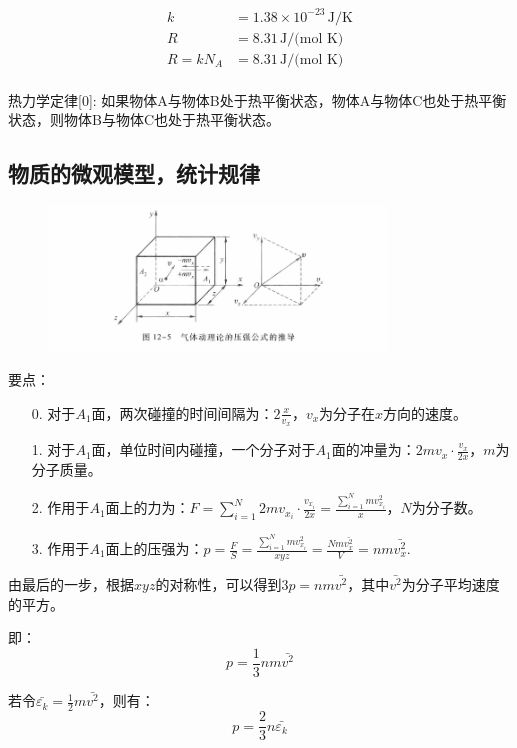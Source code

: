 \documentclass[10pt]{ctexart}
\begin{document}
\begin{align*}
    k &= 1.38 \times 10^{-23} \, \text{J/K} \\
    R &= 8.31 \, \text{J/(mol K)} \\
    R = k N_A &= 8.31 \, \text{J/(mol K)} \\
\end{align*}

热力学定律[0]: 如果物体A与物体B处于热平衡状态，物体A与物体C也处于热平衡状态，则物体B与物体C也处于热平衡状态。

\subsection{物质的微观模型，统计规律}
\label{subsec:物质的微观模型，统计规律}

\begin{figure}[H]
    \centering
    \includegraphics[width=0.8\textwidth]{img/12/1.png}
\end{figure}

要点：
\begin{itemize}
    \item [0.] 对于$A_1$面，两次碰撞的时间间隔为：$2 \frac{x}{v_x}$，$v_x$为分子在$x$方向的速度。
    \item [1.] 对于$A_1$面，单位时间内碰撞，一个分子对于$A_1$面的冲量为：$2 m v_x \cdot \frac{v_x}{2 x}$，$m$为分子质量。
    \item [2.] 作用于$A_1$面上的力为：$F = \sum_{i=1}^{N} 2 m v_{x_i} \cdot \frac{v_{x_i}}{2 x} = \frac{\sum_{i=1}^{N} m v_{x_i}^2 }{x}$，$N$为分子数。
    \item [3.] 作用于$A_1$面上的压强为：$p = \frac{F}{S} = \frac{\sum_{i=1}^{N} m v_{x_i}^2}{xyz} = \frac{Nm\bar{v_x^2}}{V} = n m \bar{v_x^2}$.
\end{itemize}

由最后的一步，根据$x y z$的对称性，可以得到$3 p = n m \bar{v^2}$，其中$\bar{v^2}$为分子平均速度的平方。

即：
$$
    p = \frac{1}{3} n m \bar{v^2}
$$

若令$\bar{\varepsilon_k} = \frac{1}{2} m \bar{v^2}$，则有：
$$
    p = \frac{2}{3} n \bar{\varepsilon_k}
$$
\end{document}

